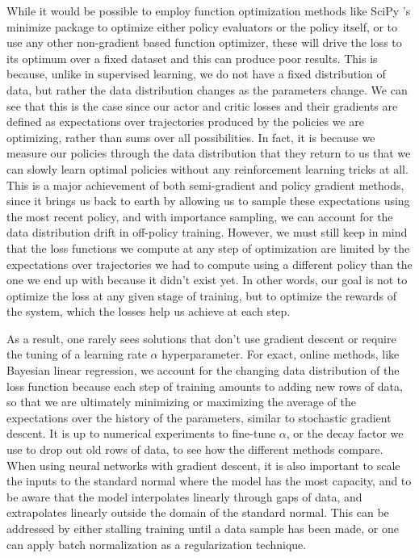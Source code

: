 \documentclass{article}
\begin{document}
While it would be possible to employ function optimization methods like SciPy 's minimize package to optimize either policy evaluators or the policy itself, or to use any other non-gradient based function optimizer, these will drive the loss to its optimum over a fixed dataset and this can produce poor results. This is because, unlike in supervised learning, we do not have a fixed distribution of data, but rather the data distribution changes as the parameters change. We can see that this is the case since our actor and critic losses and their gradients are defined as expectations over trajectories produced by the policies we are optimizing, rather than sums over all possibilities. In fact, it is because we measure our policies through the data distribution that they return to us that we can slowly learn optimal policies without any reinforcement learning tricks at all. This is a major achievement of both semi-gradient and policy gradient methods, since it brings us back to earth by allowing us to sample these expectations using the most recent policy, and with importance sampling, we can account for the data distribution drift in off-policy training. However, we must still keep in mind that the loss functions we compute at any step of optimization are limited by the expectations over trajectories we had to compute using a different policy than the one we end up with because it didn't exist yet. In other words, our goal is not to optimize the loss at any given stage of training, but to optimize the rewards of the system, which the losses help us achieve at each step.

As a result, one rarely sees solutions that don't use gradient descent or require the tuning of a learning rate $\alpha$ hyperparameter. For exact, online methods, like Bayesian linear regression, we account for the changing data distribution of the loss function because each step of training amounts to adding new rows of data, so that we are ultimately minimizing or maximizing the average of the expectations over the history of the parameters, similar to stochastic gradient descent. It is up to numerical experiments to fine-tune $\alpha$, or the decay factor we use to drop out old rows of data, to see how the different methods compare. When using neural networks with gradient descent, it is also important to scale the inputs to the standard normal where the model has the most capacity, and to be aware that the model interpolates linearly through gaps of data, and extrapolates linearly outside the domain of the standard normal. This can be addressed by either stalling training until a data sample has been made, or one can apply batch normalization\cite{batch_normalization} as a regularization technique.
\end{document}
